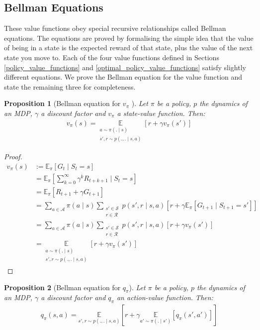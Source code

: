 \documentclass[11pt, a4paper, bibliography=totoc]{report}
\newcommand{\E}[2]{\mathbb{E}_{#1} \left[ #2 \right] }
\newtheorem{proposition}{Proposition}
\begin{document}
\subsection{Bellman Equations}
These value functions obey special recursive relationships called Bellman equations. The equations are proved by formalising the simple idea that the value of being in a state is the expected reward of that state, plus the value of the next state you move to. Each of the four value functions defined in Sections \ref{policy_value_functions} and \ref{optimal_policy_value_functions} satisfy slightly different equations. We prove the Bellman equation for the value function and state the remaining three for completeness.

\begin{proposition}[Bellman equation for $ v_\pi $ {\cite[p.~59]{Sutton2018}}]
	Let $ \pi $ be a policy, $ p $ the dynamics of an MDP, $ \gamma $ a discount factor and $ v_\pi $ a state-value function. Then:
	\begin{align}
		v_\pi(s) = \underset{\substack{a \sim \pi(. \mid s) \\ s', r \sim p(., . \mid s, a) }}{\mathbb{E}} \left[ r + \gamma v_\pi(s') \right]
	\end{align}
\end{proposition}
\begin{proof}
	\begin{align*}
		v_\pi(s) &:= \E{\pi}{G_t \mid S_t = s} \\
		         &= \E{\pi}{\sum_{k=0}^{\infty} \gamma^k R_{t+k+1} \mid S_t = s} \\
		         &= \E{\pi}{R_{t+1} + \gamma G_{t+1}} \\
		         &= \sum_{a \in \mathcal{A}} \pi(a \mid s) \sum_{\substack{s' \in \mathcal{S} \\ r \in \mathcal{R}}} p(s', r \mid s, a) \left[ r + \gamma \E{\pi}{G_{t+1} \mid S_{t+1} = s'} \right] \\
		         &= \sum_{a \in \mathcal{A}} \pi(a \mid s) \sum_{\substack{s' \in \mathcal{S} \\ r \in \mathcal{R}}} p(s', r \mid s, a) \left[ r + \gamma  v_\pi(s') \right] \\
		         &= \underset{\substack{a \sim \pi(. \mid s) \\ s', r \sim p(., . \mid s, a) }}{\mathbb{E}} \left[ r + \gamma v_\pi(s') \right]
	\end{align*}
\end{proof}

\begin{proposition}[Bellman equation for $ q_\pi $]
	Let $ \pi $ be a policy, $ p $ the dynamics of an MDP, $ \gamma $ a discount factor and $ q_\pi $ an action-value function. Then:
	\begin{align}
	q_\pi(s, a) = \underset{s', r \sim p(., . \mid s, a)}{\mathbb{E}} \left[ r + \gamma \underset{a' \sim \pi(.\mid s')}{\mathbb{E}}\left[q_\pi(s', a')\right] \right]
	\end{align}
\end{proposition}
\end{document}
